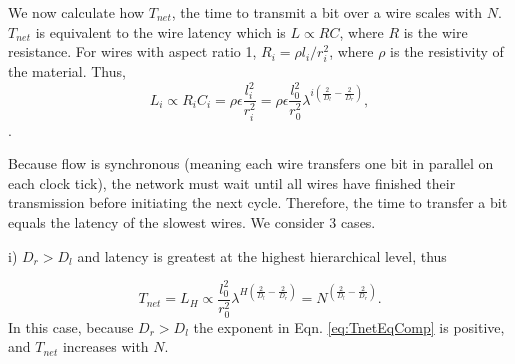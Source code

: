 \documentclass[12pt]{article}
\begin{document}


We now calculate how $T_{net}$, the time to transmit a bit over a wire scales with $N$.  $T_{net}$ is equivalent to the wire latency which is 
$L \propto RC$, where $R$ is the wire resistance.  For wires with 
aspect ratio 1, $R_i = \rho l_i /r_i^2$, where $\rho$ is the 
resistivity of the material.  Thus,
\begin{equation}
L_i \propto R_i C_i = \rho \epsilon \frac{l_i^2}{r_i^2} = \rho 
\epsilon\frac{ l_0^2}{r_0^2}\lambda^{i\left( \frac{2}{D_l} 
- \frac{2}{D_r}\right)},
\end{equation}.

Because flow is synchronous (meaning each wire transfers one bit in parallel on each clock tick), the network 
must wait until all wires have finished their transmission before 
initiating the next cycle. Therefore, the time to transfer a bit 
equals the latency of the slowest wires. We consider 3 cases.

i)  $D_r > D_l$ and latency is greatest at the highest hierarchical level, thus

\begin{equation}
\label{eq:TnetEqComp}
T_{net} = L_H \propto \frac{l_0^2}{r_0^2} \lambda^{H\left( \frac{2}{D_l} - 
\frac{2}{D_r}\right)} = N^{\left( \frac{2}{D_l} - 
\frac{2}{D_r}\right)}.
\end{equation}
In this case, because $D_r > D_l$ the exponent in Eqn. \ref{eq:TnetEqComp} is positive, and $T_{net}$ increases with $N$.
\end{document}

